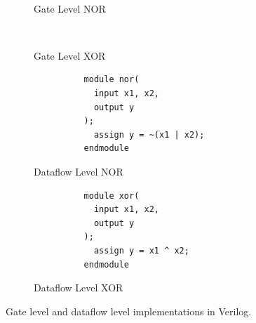   \begin{definition}
    \begin{figure}[H]
      \centering
      \begin{subfigure}[b]{0.48\textwidth}
        \centering
        \begin{lstlisting}
          
        \end{lstlisting}
        \caption{Gate Level NOR}
      \end{subfigure}
      \hfill 
      \begin{subfigure}[b]{0.48\textwidth}
        \centering
        \begin{lstlisting}
          
        \end{lstlisting}
        \caption{Gate Level XOR}
      \end{subfigure}

      \begin{subfigure}[b]{0.48\textwidth}
        \centering
        \begin{lstlisting}
          module nor(
            input x1, x2, 
            output y
          );
            assign y = ~(x1 | x2);
          endmodule
        \end{lstlisting}
        \caption{Dataflow Level NOR}
      \end{subfigure}
      \hfill 
      \begin{subfigure}[b]{0.48\textwidth}
        \centering
        \begin{lstlisting}
          module xor(
            input x1, x2, 
            output y
          );
            assign y = x1 ^ x2; 
          endmodule
        \end{lstlisting}
        \caption{Dataflow Level XOR}
      \end{subfigure}
      \caption{Gate level and dataflow level implementations in Verilog. }
    \end{figure}
  \end{definition}

